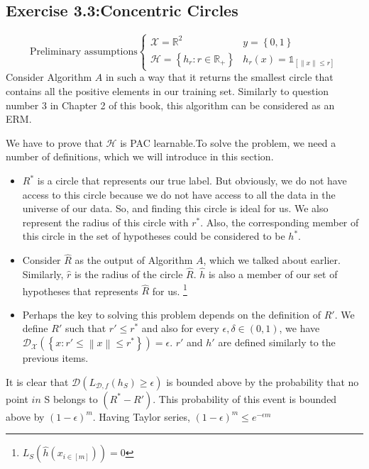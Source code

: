 \documentclass[]{book}
\begin{document}
\subsection*{Exercise 3.3:Concentric Circles}
\begin{equation*}
    \text{Preliminary assumptions}\left\{\begin{matrix}
\mathcal{X}=\mathbb{R}^2 & y=\left \{ 0,1 \right \}\\
\mathcal{H}=\left \{ h_r:r\in \mathbb{R}_+ \right \}  & h_r(x)=\mathds{1}_{[ \left \| x \right \| \leq r ]}
\end{matrix}\right.
\end{equation*}
Consider Algorithm $A$ in such a way that it returns the smallest circle that contains all the positive elements in our training set. Similarly to question number 3 in Chapter 2 of this book, this algorithm can be considered as an ERM.

We have to prove that $\mathcal{H}$ is PAC learnable.To solve the problem, we need a number of definitions, which we will introduce in this section.


\begin{itemize}
    \item \textbf{$R^*$} is a circle that represents our true label. But obviously, we do not have access to this circle because we do not have access to all the data in the universe of our data. So, and finding this circle is ideal for us. We also represent the radius of this circle with \textbf{$r^*$}. Also, the corresponding member of this circle in the set of hypotheses could be considered to be \textbf{$h^*$}.
    \item Consider $\hat{R}$ as the output of Algorithm $A$, which we talked about earlier. Similarly, $\hat{r}$ is the radius of the circle $\hat{R}$. $\hat{h}$ is also a member of our set of hypotheses that represents $\hat{R}$ for us.
    \footnote{$L_{S}(\hat{h}(x_{i\in [m]}))=0$}
    \item Perhaps the key to solving this problem depends on the definition of $R'$. We define $R'$ such that $r'\leq r^*$ and also for every $\epsilon,\delta \in (0,1)$, we have $\mathcal{D}_\mathcal{X} \left ( \left \{ x:r'\leq \left \| x \right \|\leq r^* \right \} \right )=\epsilon$. $r'$ and $h'$ are defined similarly to the previous items.
\end{itemize}
It is clear that $\mathcal{D}(L_{\mathcal{D},f}(h_S)\geq \epsilon)$ is bounded above by the probability that no point $in$ S belongs to $(R^*-R')$. This probability of this event is bounded above by $(1-\epsilon)^m$. Having Taylor series, $(1-\epsilon)^m\leq e^{-\epsilon m}$
\end{document}
